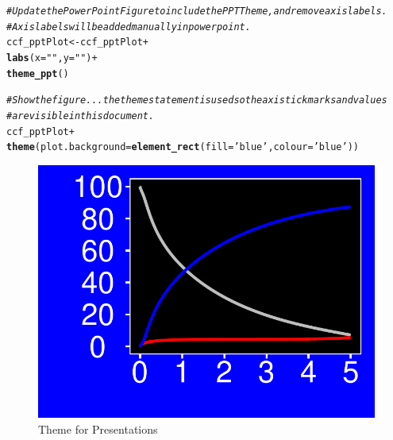 \documentclass[nojss]{jss}\usepackage[]{graphicx}\usepackage[]{color}
\makeatletter
\def\maxwidth{ %
  \ifdim\Gin@nat@width>\linewidth
    \linewidth
  \else
    \Gin@nat@width
  \fi
}
\newcommand{\hlstr}[1]{\textcolor[rgb]{0.192,0.494,0.8}{#1}}%
\newcommand{\hlcom}[1]{\textcolor[rgb]{0.678,0.584,0.686}{\textit{#1}}}%
\newcommand{\hlopt}[1]{\textcolor[rgb]{0,0,0}{#1}}%
\newcommand{\hlstd}[1]{\textcolor[rgb]{0.345,0.345,0.345}{#1}}%
\newcommand{\hlkwb}[1]{\textcolor[rgb]{0.69,0.353,0.396}{#1}}%
\newcommand{\hlkwc}[1]{\textcolor[rgb]{0.333,0.667,0.333}{#1}}%
\newcommand{\hlkwd}[1]{\textcolor[rgb]{0.737,0.353,0.396}{\textbf{#1}}}%
\newenvironment{kframe}{%
 \def\at@end@of@kframe{}%
 \ifinner\ifhmode%
  \def\at@end@of@kframe{\end{minipage}}%
  \begin{minipage}{\columnwidth}%
 \fi\fi%
 \def\FrameCommand##1{\hskip\@totalleftmargin \hskip-\fboxsep
 \colorbox{shadecolor}{##1}\hskip-\fboxsep
     \hskip-\linewidth \hskip-\@totalleftmargin \hskip\columnwidth}%
 \MakeFramed {\advance\hsize-\width
   \@totalleftmargin\z@ \linewidth\hsize
   \@setminipage}}%
 {\par\unskip\endMakeFramed%
 \at@end@of@kframe}
\newenvironment{knitrout}{}{} %
\makeatother
\begin{document}
\begin{knitrout}\footnotesize
{}\color{fgcolor}\begin{kframe}
\begin{alltt}
\hlcom{# Update the PowerPoint Figure to include the PPT Theme, and remove axis labels.}
\hlcom{# Axis labels will be added manually in powerpoint.}
\hlstd{ccf_pptPlot} \hlkwb{<-} \hlstd{ccf_pptPlot}\hlopt{+}
  \hlkwd{labs}\hlstd{(}\hlkwc{x}\hlstd{=}\hlstr{""}\hlstd{,}\hlkwc{y}\hlstd{=}\hlstr{""}\hlstd{)}\hlopt{+}
  \hlkwd{theme_ppt}\hlstd{()}

\hlcom{# Show the figure... the theme statement is used so the axis tick marks and values}
\hlcom{# are visible in this document.}
\hlstd{ccf_pptPlot} \hlopt{+}
  \hlkwd{theme}\hlstd{(}\hlkwc{plot.background} \hlstd{=} \hlkwd{element_rect}\hlstd{(}\hlkwc{fill}\hlstd{=}\hlstr{'blue'}\hlstd{,} \hlkwc{colour}\hlstd{=}\hlstr{'blue'}\hlstd{))}
\end{alltt}
\end{kframe}\begin{figure}[htpb]


{\centering \includegraphics[width=\maxwidth]{figure/beamer-powerpointTheme} 

}

\caption[Theme for Presentations]{Theme for Presentations\label{F:powerpointTheme}}
\end{figure}


\end{knitrout}

\end{document}
